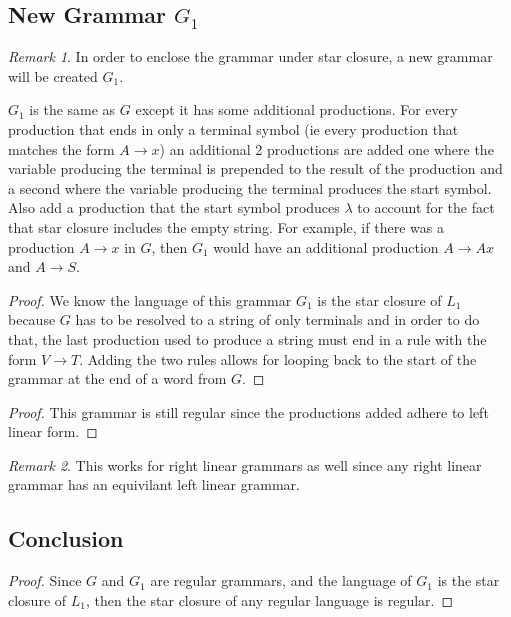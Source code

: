 \documentclass{assignment-x}
\theoremstyle{definition}
\theoremstyle{remark}
\newtheorem*{remark}{Remark}
\newenvironment{example}[1][Example]{\begin{trivlist}
    \item[\hskip \labelsep {\bfseries #1}]}{\end{trivlist}}
\begin{document}
\subsection{New Grammar $G_1$}
\begin{remark}
    In order to enclose the grammar under star closure, a new grammar will be created $G_1$. 
\end{remark}
\begin{example}
    $G_1$ is the same as $G$ except it has some additional productions. For every production that ends in only a terminal symbol (ie every production that matches the form $A \rightarrow x$) an additional 2 productions are added one where the variable producing the terminal is prepended to the result of the production and a second where the variable producing the terminal produces the start symbol. Also add a production that the start symbol produces $\lambda$ to account for the fact that star closure includes the empty string.
    For example, if there was a production $A \rightarrow x$  in $G$, then $G_1$ would have an additional production $A \rightarrow Ax$ and $A \rightarrow S$.
\end{example}
\begin{proof}
    We know the language of this grammar $G_1$ is the star closure of $L_1$ because $G$ has to be resolved to a string of only terminals and in order to do that, the last production used to produce a string must end in a rule with the form $V \rightarrow T$. Adding the two rules allows for looping back to the start of the grammar at the end of a word from $G$.
\end{proof}
\begin{proof}
    This grammar is still regular since the productions added adhere to left linear form.
\end{proof}
\begin{remark}
    This works for right linear grammars as well since any right linear grammar has an equivilant left linear grammar.
\end{remark}

\subsection{Conclusion}
\begin{proof}
    Since $G$ and $G_1$ are regular grammars, and the language of $G_1$ is the star closure of $L_1$, then the star closure of any regular language is regular.   
\end{proof}
\end{document}
